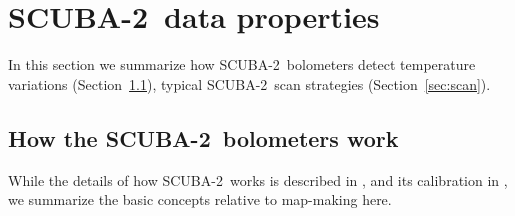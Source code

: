 \documentclass[useAMS,usenatbib,nofootinbib]{mn2e}
\newcommand{\scuba}{SCUBA-2}
\begin{document}


\section{\scuba\ data properties}
\label{sec:data}

In this section we summarize how \scuba\ bolometers detect temperature
variations (Section~\ref{sec:bolos}), typical \scuba\ scan strategies
(Section~\ref{sec:scan}).

\subsection{How the \scuba\ bolometers work}
\label{sec:bolos}

While the details of how \scuba\ works is described in
\citet{holland2012}, and its calibration in \citet{dempsey2012}, we
summarize the basic concepts relative to map-making here.
\end{document}
